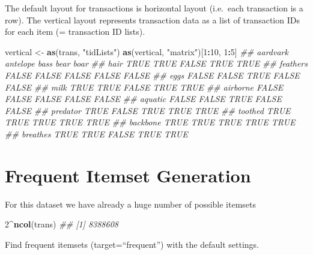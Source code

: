 \documentclass[
  notitlepage]{book}
\newenvironment{Shaded}{\begin{snugshade}}{\end{snugshade}}
\newcommand{\CommentTok}[1]{\textcolor[rgb]{0.56,0.35,0.01}{\textit{#1}}}
\newcommand{\DecValTok}[1]{\textcolor[rgb]{0.00,0.00,0.81}{#1}}
\newcommand{\KeywordTok}[1]{\textcolor[rgb]{0.13,0.29,0.53}{\textbf{#1}}}
\newcommand{\NormalTok}[1]{#1}
\newcommand{\OperatorTok}[1]{\textcolor[rgb]{0.81,0.36,0.00}{\textbf{#1}}}
\newcommand{\StringTok}[1]{\textcolor[rgb]{0.31,0.60,0.02}{#1}}
\begin{document}
The default layout for transactions is horizontal layout (i.e.~each
transaction is a row). The vertical layout represents transaction data
as a list of transaction IDs for each item (= transaction ID lists).

\begin{Shaded}
\begin{Highlighting}[]
\NormalTok{vertical \textless{}{-}}\StringTok{ }\KeywordTok{as}\NormalTok{(trans, }\StringTok{"tidLists"}\NormalTok{)}
\KeywordTok{as}\NormalTok{(vertical, }\StringTok{"matrix"}\NormalTok{)[}\DecValTok{1}\OperatorTok{:}\DecValTok{10}\NormalTok{, }\DecValTok{1}\OperatorTok{:}\DecValTok{5}\NormalTok{]}
\CommentTok{\#\#          aardvark antelope  bass  bear  boar}
\CommentTok{\#\# hair         TRUE     TRUE FALSE  TRUE  TRUE}
\CommentTok{\#\# feathers    FALSE    FALSE FALSE FALSE FALSE}
\CommentTok{\#\# eggs        FALSE    FALSE  TRUE FALSE FALSE}
\CommentTok{\#\# milk         TRUE     TRUE FALSE  TRUE  TRUE}
\CommentTok{\#\# airborne    FALSE    FALSE FALSE FALSE FALSE}
\CommentTok{\#\# aquatic     FALSE    FALSE  TRUE FALSE FALSE}
\CommentTok{\#\# predator     TRUE    FALSE  TRUE  TRUE  TRUE}
\CommentTok{\#\# toothed      TRUE     TRUE  TRUE  TRUE  TRUE}
\CommentTok{\#\# backbone     TRUE     TRUE  TRUE  TRUE  TRUE}
\CommentTok{\#\# breathes     TRUE     TRUE FALSE  TRUE  TRUE}
\end{Highlighting}
\end{Shaded}

\hypertarget{frequent-itemset-generation}{%
\section{Frequent Itemset Generation}\label{frequent-itemset-generation}}

For this dataset we have already a huge number of possible itemsets

\begin{Shaded}
\begin{Highlighting}[]
\DecValTok{2}\OperatorTok{\^{}}\KeywordTok{ncol}\NormalTok{(trans)}
\CommentTok{\#\# [1] 8388608}
\end{Highlighting}
\end{Shaded}

Find frequent itemsets (target=``frequent'') with the default settings.
\end{document}
